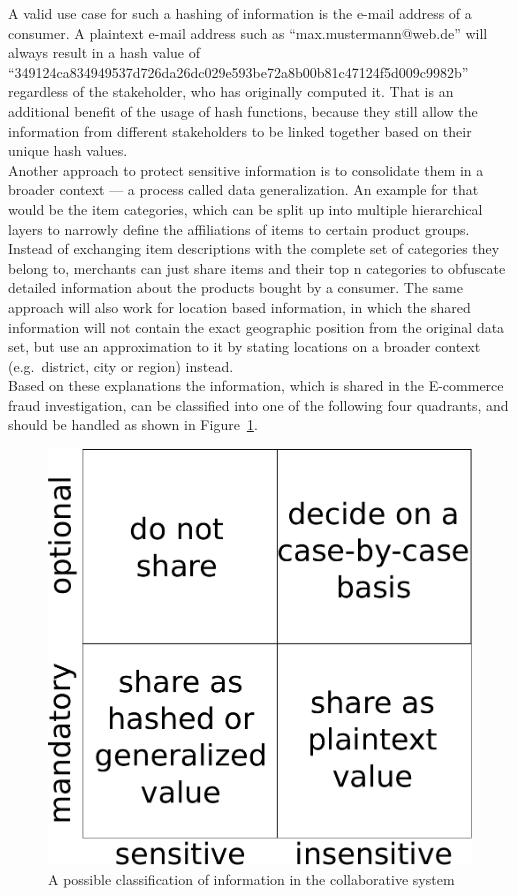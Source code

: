 A valid use case for such a hashing of information is the e-mail address of a consumer. A plaintext e-mail address such as ``max.mustermann@web.de'' will always result in a hash value of ``349124ca834949537d726da26dc029e593be72a8b00b81c47124f5d009c9982b'' regardless of the stakeholder, who has originally computed it. That is an additional benefit of the usage of hash functions, because they still allow the information from different stakeholders to be linked together based on their unique hash values. \\

Another approach to protect sensitive information is to consolidate them in a broader context --- a process called data generalization. An example for that would be the item categories, which can be split up into multiple hierarchical layers to narrowly define the affiliations of items to certain product groups. Instead of exchanging item descriptions with the complete set of categories they belong to, merchants can just share items and their top n categories to obfuscate detailed information about the products bought by a consumer. The same approach will also work for location based information, in which the shared information will not contain the exact geographic position from the original data set, but use an approximation to it by stating locations on a broader context (e.g.\ district, city or region) instead. \\

Based on these explanations the information, which is shared in the \gls{E-commerce} fraud investigation, can be classified into one of the following four quadrants, and should be handled as shown in Figure~\ref{fig:images_handle_privacy_concerns}. \@

\begin{figure}[H]
	\centering
		\includegraphics[width=0.5\columnwidth]{images/privacy_concerns.pdf}
	\caption{A possible classification of information in the collaborative system}
\label{fig:images_handle_privacy_concerns}
\end{figure}


